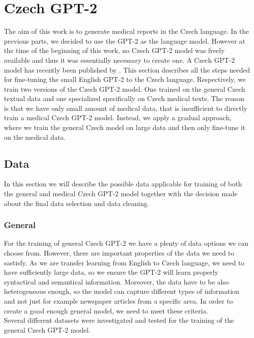 \section{Czech GPT-2}
\label{sec:czechGpt2}
The aim of this work is to generate medical reports in the Czech language. In the previous parts, we decided to use the GPT-2 as the language model. However at the time of the beginning of this work, no Czech GPT-2 model was freely available and thus it was essentially necessary to create one. A Czech GPT-2 model has recently been published by \citet{hajek_horak2022}. This section describes all the steps needed for fine-tuning the small English GPT-2 to the Czech language. Respectively, we train two versions of the Czech GPT-2 model. One trained on the general Czech textual data and one specialized specifically on Czech medical texts. The reason is that we have only small amount of medical data, that is insufficient to directly train a medical Czech GPT-2 model. Instead, we apply a gradual approach, where we train the general Czech model on large data and then only fine-tune it on the medical data.

\subsection{Data}
\label{sec:gptData}
In this section we will describe the possible data applicable for training of both the general and medical Czech GPT-2 model together with the decision made about the final data selection and data cleaning.

\subsubsection{General}
For the training of general Czech GPT-2 we have a plenty of data options we can choose from. However, there are important properties of the data we need to sastisfy. As we are transfer learning from English to Czech language, we need to have sufficiently large data, so we ensure the GPT-2 will learn properly syntactical and semantical information. Moreover, the data have to be also heterogeneous enough, so the model can capture different types of information and not just for example newspaper articles from a specific area. In order to create a good enough general model, we need to meet these criteria.\\

Several different datasets were investigated and tested for the training of the general Czech GPT-2 model.
